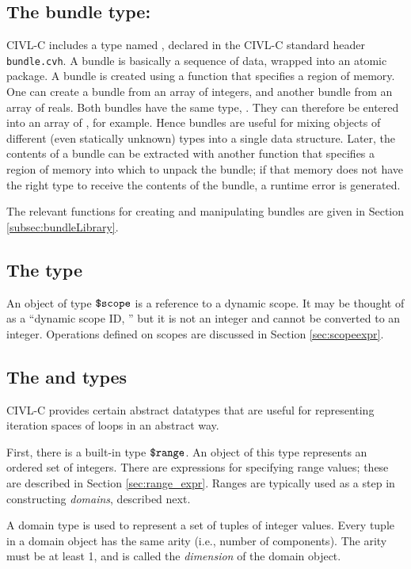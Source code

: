 \subsection{The bundle type: \cbundle}
\label{subsec:bundleType}

CIVL-C includes a type named \cbundle, declared in the CIVL-C standard header \texttt{bundle.cvh}. A bundle is basically a
sequence of data, wrapped into an atomic package. A bundle is created
using a function that specifies a region of memory. One can create a
bundle from an array of integers, and another bundle from an array of
reals. Both bundles have the same type, \cbundle. They can therefore
be entered into an array of \cbundle, for example. Hence bundles are
useful for mixing objects of different (even statically unknown) types
into a single data structure. Later, the contents of a bundle can be
extracted with another function that specifies a region of memory into
which to unpack the bundle; if that memory does not have the right
type to receive the contents of the bundle, a runtime error is
generated.

The relevant functions for creating and manipulating bundles
are given in Section \ref{subsec:bundleLibrary}.

\subsection{The \cscope{} type}
\label{sec:scopetype}

An object of type $\mbox{\texttt{\${}scope}}$ is a reference to a dynamic scope.  It may
be thought of as a ``dynamic scope ID, '' but it is not an integer and
cannot be converted to an integer.  Operations defined on scopes are
discussed in Section \ref{sec:scopeexpr}.

\subsection{The \crange{} and \cdomain{} types}

CIVL-C provides certain abstract datatypes that are useful for
representing iteration spaces of loops in an abstract way.

First, there is a built-in type $\mbox{\texttt{\${}range}}$.  An object of this type
represents an ordered set of integers.  There are expressions for
specifying range values; these are described in Section
\ref{sec:range_expr}.   Ranges are typically used as a step
in constructing \emph{domains}, described next.

A domain type is used to represent a set of tuples of integer values.
Every tuple in a domain object has the same arity (i.e., number of
components).  The arity must be at least 1, and is called the
\emph{dimension} of the domain object.

